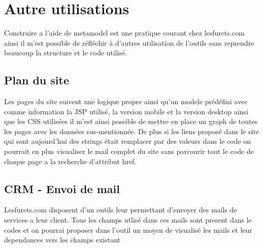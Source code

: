 \section{Autre utilisations}
Construire a l’aide de metamodel est une pratique courant chez lesfurets.com ainsi il m’est possible de réfléchir à d’autres utilisation de l’outils sans reprendre beaucoup la structure et le code utilisé. 

\subsection{Plan du site}
Les pages du site suivent une logique propre ainsi qu’un modele prédéfini avec comme information la JSP utilisé, la version mobile et la version desktop ainsi que les CSS utilisées il m’est ainsi possible de mettre en place un graph de toutes les pages avec les données sus-mentionnée. De plus si les liens proposé dans le site qui sont aujourd’hui des strings était remplacer par des valeurs dans le code on pourrait en plus visualiser le mail complet du site sans parcourir tout le code de chaque page a la recherche d’attribut href.

\subsection{CRM - Envoi de mail}
Lesfurets.com disposent d’un outils leur permettant d’envoyer des mails de services a leur client. Tous les champs utlisé dans ces mails sont present dans le codes et on pourrai proposer dans l’outil un moyen de visualisé les mails et leur dependances vers les champs existant